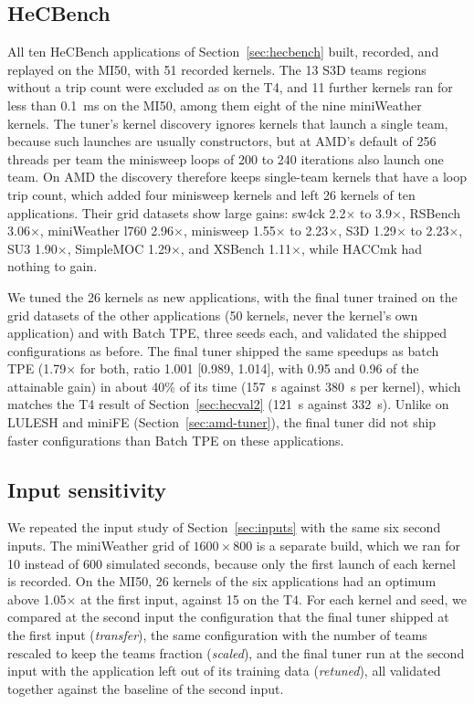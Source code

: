 \documentclass[10pt]{article}
\newcommand{\x}{\ensuremath{\times}}
\begin{document}
\subsection{HeCBench}
\label{sec:amd-hecbench}
All ten HeCBench applications of Section~\ref{sec:hecbench} built, recorded,
and replayed on the MI50, with 51 recorded kernels. The 13 S3D teams regions
without a trip count were excluded as on the T4, and 11 further kernels ran
for less than 0.1~ms on the MI50, among them eight of the nine miniWeather
kernels. The tuner's kernel discovery ignores kernels that launch a single team,
because such launches are usually constructors, but at AMD's default of 256
threads per team the minisweep loops of 200 to 240 iterations also launch one
team. On AMD the discovery therefore keeps single-team kernels that have a loop
trip count, which added four minisweep kernels and left 26 kernels of ten
applications. Their grid datasets show large gains: sw4ck 2.2\x{} to 3.9\x{},
RSBench 3.06\x{}, miniWeather l760 2.96\x{}, minisweep 1.55\x{} to 2.23\x{},
S3D 1.29\x{} to 2.23\x{}, SU3 1.90\x{}, SimpleMOC 1.29\x{}, and XSBench
1.11\x{}, while HACCmk had nothing to gain.

We tuned the 26 kernels as new applications, with the final tuner trained on
the grid datasets of the other applications (50 kernels, never the kernel's own
application) and with Batch TPE, three seeds each, and validated the shipped
configurations as before. The final tuner shipped the same speedups as batch
TPE (1.79\x{} for both, ratio 1.001 [0.989, 1.014], with 0.95 and 0.96 of the
attainable gain) in about 40\% of its time (157~s against 380~s per kernel),
which matches the T4 result of Section~\ref{sec:hecval2} (121~s against
332~s). Unlike on LULESH and miniFE (Section~\ref{sec:amd-tuner}), the final
tuner did not ship faster configurations than Batch TPE on these
applications.

\subsection{Input sensitivity}
\label{sec:amd-inputs}
We repeated the input study of Section~\ref{sec:inputs} with the same six
second inputs. The miniWeather grid of $1600\times 800$ is a separate build,
which we ran for 10 instead of 600 simulated seconds, because only the first
launch of each kernel is recorded. On the MI50, 26 kernels of the six
applications had an optimum above 1.05\x{} at the first input, against 15 on the
T4. For each kernel and seed, we compared at the second input the configuration
that the final tuner shipped at the first input (\emph{transfer}), the same
configuration with the number of teams rescaled to keep the teams fraction
(\emph{scaled}), and the final tuner run at the second input with the
application left out of its training data (\emph{retuned}), all validated
together against the baseline of the second input.
\end{document}
